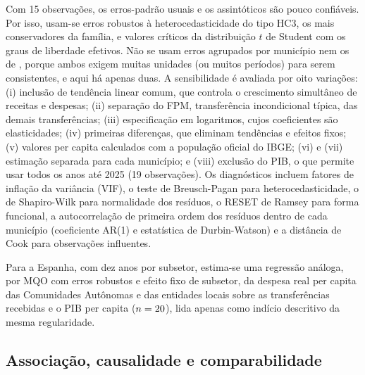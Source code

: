 Com 15 observações, os erros-padrão usuais e os assintóticos são pouco confiáveis. Por isso, usam-se erros robustos à heterocedasticidade do tipo HC3, os mais conservadores da família, e valores críticos da distribuição $t$ de Student com os graus de liberdade efetivos. Não se usam erros agrupados por município nem os de , porque ambos exigem muitas unidades (ou muitos períodos) para serem consistentes, e aqui há apenas duas. A sensibilidade é avaliada por oito variações: (i) inclusão de tendência linear comum, que controla o crescimento simultâneo de receitas e despesas; (ii) separação do FPM, transferência incondicional típica, das demais transferências; (iii) especificação em logaritmos, cujos coeficientes são elasticidades; (iv) primeiras diferenças, que eliminam tendências e efeitos fixos; (v) valores per capita calculados com a população oficial do IBGE; (vi) e (vii) estimação separada para cada município; e (viii) exclusão do PIB, o que permite usar todos os anos até 2025 (19 observações). Os diagnósticos incluem fatores de inflação da variância (VIF), o teste de Breusch-Pagan para heterocedasticidade, o de Shapiro-Wilk para normalidade dos resíduos, o RESET de Ramsey para forma funcional, a autocorrelação de primeira ordem dos resíduos dentro de cada município (coeficiente AR(1) e estatística de Durbin-Watson) e a distância de Cook para observações influentes.

Para a Espanha, com dez anos por subsetor, estima-se uma regressão análoga, por MQO com erros robustos e efeito fixo de subsetor, da despesa real per capita das Comunidades Autônomas e das entidades locais sobre as transferências recebidas e o PIB per capita ($n=20$), lida apenas como indício descritivo da mesma regularidade.

\subsection{Associação, causalidade e comparabilidade}

